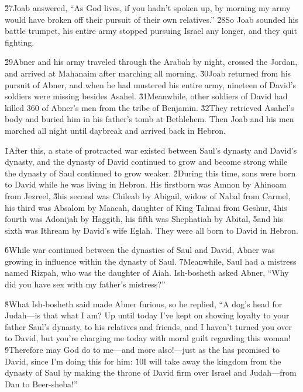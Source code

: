 \v{27}Joab answered, ``As God lives, if you hadn't spoken up, by morning my army would have broken off their pursuit of their own relatives.'' \v{28}So Joab sounded his battle trumpet, his entire army stopped pursuing Israel any longer, and they quit fighting.

\v{29}Abner and his army traveled through the Arabah by night, crossed the Jordan, and arrived at Mahanaim after marching all morning. \v{30}Joab returned from his pursuit of Abner, and when he had mustered his entire army, nineteen of David's soldiers were missing besides Asahel. \v{31}Meanwhile, other soldiers of David had killed 360 of Abner's men from the tribe of Benjamin. \v{32}They retrieved Asahel's body and buried him in his father's tomb at Bethlehem. Then Joab and his men marched all night until daybreak and arrived back in Hebron.

\v{1}After this, a state of protracted war existed between Saul's dynasty and David's dynasty, and the dynasty of David continued to grow and become strong while the dynasty of Saul continued to grow weaker. \v{2}During this time, sons were born to David while he was living in Hebron. His firstborn was Amnon by Ahinoam from Jezreel, \v{3}his second was Chileab by Abigail, widow of Nabal from Carmel, his third was Absalom by Maacah, daughter of King Talmai from Geshur, \v{4}his fourth was Adonijah by Haggith, his fifth was Shephatiah by Abital, \v{5}and his sixth was Ithream by David's wife Eglah. They were all born to David in Hebron.

\v{6}While war continued between the dynasties of Saul and David, Abner was growing in influence within the dynasty of Saul. \v{7}Meanwhile, Saul had a mistress named Rizpah, who was the daughter of Aiah. Ish-bosheth asked Abner, ``Why did you have sex with my father's mistress?''

\v{8}What Ish-bosheth said made Abner furious, so he replied, ``A dog's head for Judah---is that what I am? Up until today I've kept on showing loyalty to your father Saul's dynasty, to his relatives and friends, and I haven't turned you over to David, but you're charging me today with moral guilt regarding this woman! \v{9}Therefore may God do to me---and more also!---just as the  has promised to David, since I'm doing this for him: \v{10}I will take away the kingdom from the dynasty of Saul by making the throne of David firm over Israel and Judah---from Dan to Beer-sheba!''

